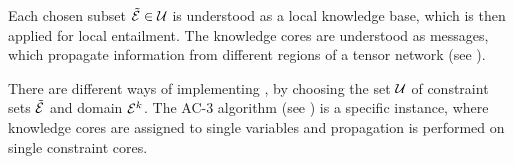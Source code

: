 
Each chosen subset $\tilde{\mathcal{E}}\in\mathcal{U}$ is understood as a local knowledge base, which is then applied for local entailment.
The knowledge cores are understood as messages, which propagate information from different regions of a tensor network (see ).


There are different ways of implementing , by choosing the set $\mathcal{U}$ of constraint sets $\tilde{\mathcal{E}}$ and domain $\mathcal{E}^{k}$. %
The AC-3 algorithm (see \cite{mackworth_consistency_1977}) is a specific instance, where knowledge cores are assigned to single variables and propagation is performed on single constraint cores.


%



